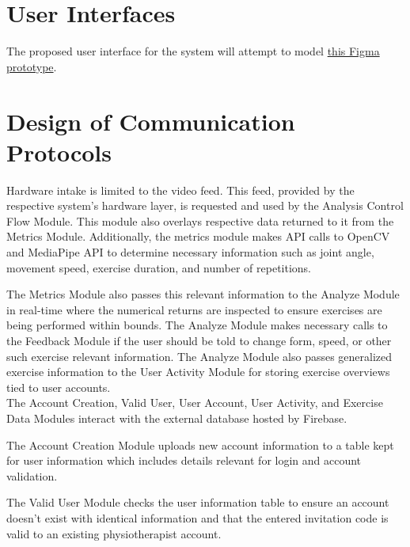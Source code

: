 \documentclass[12pt, titlepage]{article}
\begin{document}

\section{User Interfaces}

The proposed user interface for the system will attempt to model \href{https://www.figma.com/proto/iN6fa0vryIXy93T6WzI0ar/PhysioCompanion?node-id=2-2&p=f&t=ptzi0TqvqeeRyjGj-1&scaling=min-zoom&content-scaling=fixed&page-id=0%3A1&starting-point-node-id=2%3A2}{this Figma prototype}.

\section{Design of Communication Protocols}

Hardware intake is limited to the video feed. This feed, provided by the respective system's hardware layer, is requested and used by the Analysis Control Flow Module.
This module also overlays respective data returned to it from the Metrics Module.
Additionally, the metrics module makes API calls to OpenCV and MediaPipe API to determine necessary information such as joint angle, movement speed, exercise duration, and number of repetitions.

The Metrics Module also passes this relevant information to the Analyze Module in real-time where the numerical returns are inspected to ensure exercises are being performed within bounds.
The Analyze Module makes necessary calls to the Feedback Module if the user should be told to change form, speed, or other such exercise relevant information.
The Analyze Module also passes generalized exercise information to the User Activity Module for storing exercise overviews tied to user accounts. \\

The Account Creation, Valid User, User Account, User Activity, and Exercise Data Modules interact with the external database hosted by Firebase.

The Account Creation Module uploads new account information to a table kept for user information which includes details relevant for login and account validation.

The Valid User Module checks the user information table to ensure an account doesn't exist with identical information and that the entered invitation code is valid to an existing physiotherapist account.
\end{document}
